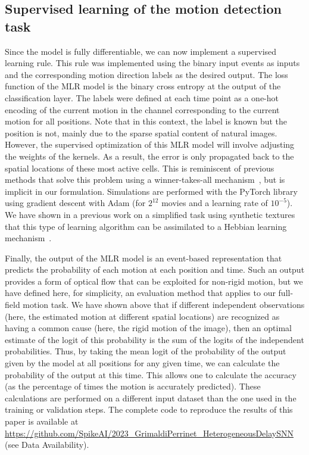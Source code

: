 \documentclass[default]{sn-jnl}%
\theoremstyle{thmstyleone}%
\theoremstyle{thmstyletwo}%
\theoremstyle{thmstylethree}%
\begin{document}
\subsection{Supervised learning of the motion detection task}
%
Since the model is fully differentiable, we can now implement a supervised learning rule. This rule was implemented using the binary input events as inputs and the corresponding motion direction labels as the desired output. The loss function of the MLR model is the binary cross entropy at the output of the classification layer. The labels were defined at each time point as a one-hot encoding of the current motion in the channel corresponding to the current motion for all positions. Note that in this context, the label is known but the position is not, mainly due to the sparse spatial content of natural images. However, the supervised optimization of this MLR model will involve adjusting the weights of the kernels. As a result, the error is only propagated back to the spatial locations of these most active cells. This is reminiscent of previous methods that solve this problem using a winner-takes-all mechanism~\citep{masquelier_unsupervised_2007}, but is implicit in our formulation. Simulations are performed with the PyTorch library using gradient descent with Adam (for $2^{12}$ movies and a learning rate of $10^{-5}$). We have shown in a previous work on a simplified task using synthetic textures that this type of learning algorithm can be assimilated to a Hebbian learning mechanism~\cite{grimaldi_robust_2022}.

Finally, the output of the MLR model is an event-based representation that predicts the probability of each motion at each position and time. Such an output provides a form of optical flow that can be exploited for non-rigid motion, but we have defined here, for simplicity, an evaluation method that applies to our full-field motion task. We have shown above that if different independent observations (here, the estimated motion at different spatial locations) are recognized as having a common cause (here, the rigid motion of the image), then an optimal estimate of the logit of this probability is the sum of the logits of the independent probabilities. Thus, by taking the mean logit of the probability of the output given by the model at all positions for any given time, we can calculate the probability of the output at this time. This allows one to calculate the accuracy (as the percentage of times the motion is accurately predicted). These calculations are performed on a different input dataset than the one used in the training or validation steps. The complete code to reproduce the results of this paper is available at \url{https://github.com/SpikeAI/2023_GrimaldiPerrinet_HeterogeneousDelaySNN} (see Data Availability). %
%
\end{document}
